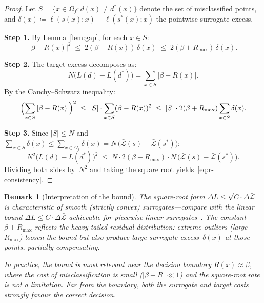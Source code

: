 \documentclass[11pt]{article}
\newtheorem{remark}[theorem]{Remark}
\newcommand{\Lcal}{\mathcal{L}}
\begin{document}
\begin{proof}
Let $S = \{x \in \Omega_f : d(x) \ne d^*(x)\}$ denote the set of
misclassified points, and $\delta(x) \coloneqq \ell(s(x); x) - \ell(s^*(x); x)$
the pointwise surrogate excess.

\textbf{Step 1.}  By Lemma~\ref{lem:gap}, for each $x \in S$:
\begin{equation}
  |\beta - R(x)|^2
  \;\le\; 2(\beta + R(x))\,\delta(x)
  \;\le\; 2(\beta + R_{\max})\,\delta(x).
\end{equation}

\textbf{Step 2.}  The target excess decomposes as:
\begin{equation}
  N\bigl(L(d) - L(d^*)\bigr) = \sum_{x \in S} |\beta - R(x)|.
\end{equation}
By the Cauchy--Schwarz inequality:
\begin{equation}
  \Bigl(\sum_{x \in S} |\beta - R(x)|\Bigr)^2
  \;\le\; |S| \cdot \sum_{x \in S} (\beta - R(x))^2
  \;\le\; |S| \cdot 2(\beta + R_{\max}) \sum_{x \in S} \delta(x).
\end{equation}

\textbf{Step 3.}  Since $|S| \le N$ and
$\sum_{x \in S} \delta(x) \le \sum_{x \in \Omega_f} \delta(x)
= N\,\bigl(\bar{\Lcal}(s) - \bar{\Lcal}(s^*)\bigr)$:
\begin{equation}
  N^2\bigl(L(d) - L(d^*)\bigr)^2
  \;\le\; N \cdot 2(\beta + R_{\max}) \cdot N\,
    \bigl(\bar{\Lcal}(s) - \bar{\Lcal}(s^*)\bigr).
\end{equation}
Dividing both sides by~$N^2$ and taking the square root
yields~\eqref{eq:r-consistency}.
\end{proof}

\begin{remark}[Interpretation of the bound]\label{rem:bound-interpretation}
The square-root form $\Delta L \le \sqrt{C \cdot \Delta\bar{\Lcal}}$ is
characteristic of smooth (strictly convex) surrogates---compare with the linear
bound $\Delta L \le C \cdot \Delta\bar{\Lcal}$ achievable for piecewise-linear
surrogates~\cite{bartlett2006convexity}.  The constant $\beta + R_{\max}$ reflects the
heavy-tailed residual distribution: extreme outliers (large $R_{\max}$) loosen the
bound but also produce large surrogate excess~$\delta(x)$ at those points,
partially compensating.

In practice, the bound is most relevant near the decision boundary $R(x) \approx
\beta$, where the cost of misclassification is small ($|\beta - R| \ll 1$) and the
square-root rate is not a limitation.  Far from the boundary, both the surrogate and
target costs strongly favour the correct decision.
\end{remark}
\end{document}
